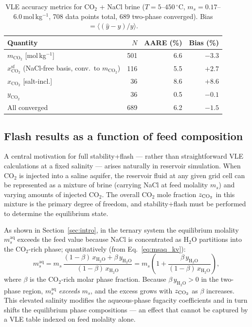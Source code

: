 \documentclass[preprint,12pt,number]{elsarticle}
\begin{document}
\begin{table}[H]
  \centering
  \caption{VLE accuracy metrics for CO$_2$ + NaCl brine ($T = 5$--$450\,^\circ$C,
           $m_s = 0.17$--$6.0$\,mol\,kg$^{-1}$, 708 data points total,
           689 two-phase converged). Bias $= \langle(\hat{y} - y)/y\rangle$.}
  \label{tab:co2nacl_metrics}
  \begin{tabular}{lrrr}
    \toprule
    Quantity & $N$ & AARE (\%) & Bias (\%) \\
    \midrule
    $m_{\text{CO}_2}$ [mol\,kg$^{-1}$]            & 501 & 6.6 & $-3.3$ \\
    $x_{\text{CO}_2}^{\text{sf}}$ (NaCl-free basis, conv.\ to $m_{\text{CO}_2}$) & 116 & 5.5 & $+2.7$ \\
    $x_{\text{CO}_2}$ [salt-incl.]    &  36 & 8.6 & $+8.6$ \\
    $y_{\text{CO}_2}$                 &  36 & 0.5 & $-0.1$ \\
    \midrule
    All converged           & 689 & 6.2 & $-1.5$ \\
    \bottomrule
  \end{tabular}
\end{table}







\subsection{Flash results as a function of feed composition}
\label{sec:flash_vs_z}

A central motivation for full stability+flash --- rather than straightforward
VLE calculations at a fixed salinity --- arises naturally in reservoir simulation.
When CO$_2$ is injected into a saline aquifer, the reservoir fluid at any given
grid cell can be represented as a mixture of brine (carrying NaCl at feed molality
$m_s$) and varying amounts of injected CO$_2$.
The overall CO$_2$ mole fraction $z_{\rm CO_2}$ in this mixture is the primary degree of freedom,
and stability+flash must be performed to determine the equilibrium state.

As shown in Section~\ref{sec:intro}, in the ternary system the equilibrium molality
$m_s^\mathrm{aq}$ exceeds the feed value because NaCl is concentrated as H$_2$O
partitions into the CO$_2$-rich phase; quantitatively (from Eq.~\ref{eq:msaq_kv}):
\begin{equation*}
  m_s^\mathrm{aq}
    = m_s
      \,\frac{(1-\beta)\,x_{\mathrm{H_2O}}+\beta\,y_{\mathrm{H_2O}}}
             {(1-\beta)\,x_{\mathrm{H_2O}}}
    = m_s\!\left(1 + \frac{\beta\,y_{\mathrm{H_2O}}}{(1-\beta)\,x_{\mathrm{H_2O}}}\right),
\end{equation*}
where $\beta$ is the CO$_2$-rich molar phase fraction.
Because $\beta\,y_{\mathrm{H_2O}} > 0$ in the two-phase region, $m_s^\mathrm{aq}$
\emph{exceeds} $m_s$, and the excess grows with $z_{\rm CO_2}$ as $\beta$ increases.
This elevated salinity modifies the aqueous-phase fugacity coefficients and in
turn shifts the equilibrium phase compositions --- an effect that cannot be
captured by a VLE table indexed on feed molality alone.
\end{document}
